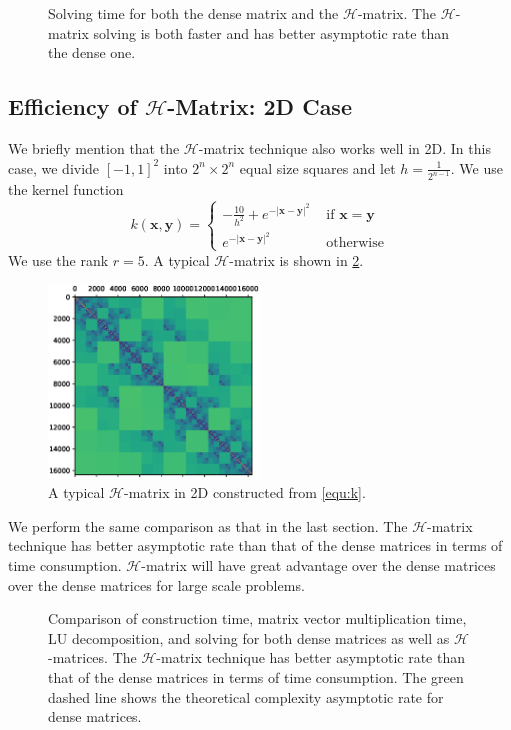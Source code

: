 \documentclass[10pt,a4paper]{article}
\newcommand{\bx}[0]{\mathbf{x}}
\theoremstyle{definition}
\newcommand{\by}[0]{\mathbf{y}}
\begin{document}
\begin{figure}[htpb]
\centering
\scalebox{0.6}{}
\caption{Solving time for both the dense matrix and the $\mathcal{H}$-matrix. The $\mathcal{H}$-matrix solving is both faster and has better asymptotic rate than the dense one.}
\label{fig:solve}
\end{figure}

\subsection{Efficiency of $\mathcal{H}$-Matrix: 2D Case}

We briefly mention that the $\mathcal{H}$-matrix technique also works well in 2D. In this case, we divide $[-1,1]^2$ into $2^n\times 2^n$ equal size squares and let $h=\frac{1}{2^{n-1}}$. We use the kernel function
\begin{equation}\label{equ:k}
	k(\bx,\by) = \begin{cases}
		-\frac{10}{h^2} + e^{-|\bx-\by|^2} & \mbox{ if } \bx=\by\\
		e^{-|\bx-\by|^2} & \mbox{ otherwise}
	\end{cases}
\end{equation}
We use the rank $r=5$. A typical $\mathcal{H}$-matrix is shown in \cref{fig:2d}.

\begin{figure}[H] %
\centering
\includegraphics[width=0.5\textwidth,keepaspectratio]{figures/2D}
\caption{A typical $\mathcal{H}$-matrix in 2D constructed from \cref{equ:k}.}
\label{fig:2d}
\end{figure}


We perform the same comparison as that in the last section. The $\mathcal{H}$-matrix technique has better asymptotic rate than that of the dense matrices in terms of time consumption. $\mathcal{H}$-matrix will have great advantage over the dense matrices over the dense matrices for large scale problems. 
\begin{figure}[htpb]
\centering
\scalebox{0.6}{}
\caption{Comparison of construction time, matrix vector multiplication time, LU decomposition, and solving for both dense matrices as well as $\mathcal{H}$-matrices. The $\mathcal{H}$-matrix technique has better asymptotic rate than that of the dense matrices in terms of time consumption. The green dashed line shows the theoretical complexity asymptotic rate for dense matrices.}
\label{fig:solve}
\end{figure}
\end{document}
